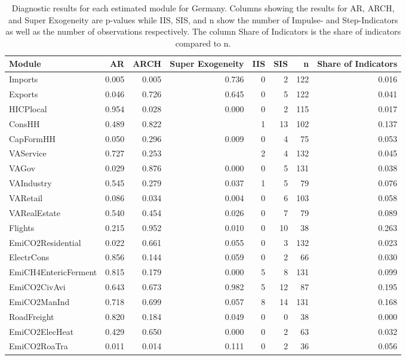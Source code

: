 \begin{table}
\centering
\caption{\label{tab:DE_diagnostics}Diagnostic results for each estimated module for Germany. Columns showing the results for AR, ARCH, and Super Exogeneity are p-values while IIS, SIS, and n show the number of Impulse- and Step-Indicators as well as the number of observations respectively. The column Share of Indicators is the share of indicators compared to n.}
\centering
\begin{tabular}[t]{lrrrrrrr}
\toprule
Module & AR & ARCH & Super Exogeneity & IIS & SIS & n & Share of Indicators\\
\midrule
Imports & 0.005 & 0.005 & 0.736 & 0 & 2 & 122 & 0.016\\
Exports & 0.046 & 0.726 & 0.645 & 0 & 5 & 122 & 0.041\\
HICPlocal & 0.954 & 0.028 & 0.000 & 0 & 2 & 115 & 0.017\\
ConsHH & 0.489 & 0.822 &  & 1 & 13 & 102 & 0.137\\
CapFormHH & 0.050 & 0.296 & 0.009 & 0 & 4 & 75 & 0.053\\
\addlinespace
VAService & 0.727 & 0.253 &  & 2 & 4 & 132 & 0.045\\
VAGov & 0.029 & 0.876 & 0.000 & 0 & 5 & 131 & 0.038\\
VAIndustry & 0.545 & 0.279 & 0.037 & 1 & 5 & 79 & 0.076\\
VARetail & 0.086 & 0.034 & 0.004 & 0 & 6 & 103 & 0.058\\
VARealEstate & 0.540 & 0.454 & 0.026 & 0 & 7 & 79 & 0.089\\
\addlinespace
Flights & 0.215 & 0.952 & 0.010 & 0 & 10 & 38 & 0.263\\
EmiCO2Residential & 0.022 & 0.661 & 0.055 & 0 & 3 & 132 & 0.023\\
ElectrCons & 0.856 & 0.144 & 0.059 & 0 & 2 & 66 & 0.030\\
EmiCH4EntericFerment & 0.815 & 0.179 & 0.000 & 5 & 8 & 131 & 0.099\\
EmiCO2CivAvi & 0.643 & 0.673 & 0.982 & 5 & 12 & 87 & 0.195\\
\addlinespace
EmiCO2ManInd & 0.718 & 0.699 & 0.057 & 8 & 14 & 131 & 0.168\\
RoadFreight & 0.820 & 0.184 & 0.049 & 0 & 0 & 38 & 0.000\\
EmiCO2ElecHeat & 0.429 & 0.650 & 0.000 & 0 & 2 & 63 & 0.032\\
EmiCO2RoaTra & 0.011 & 0.014 & 0.111 & 0 & 2 & 36 & 0.056\\
\bottomrule
\end{tabular}
\end{table}
